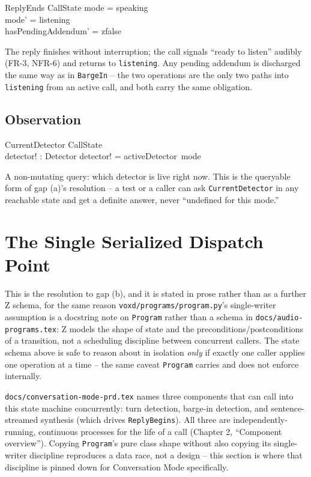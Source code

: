 \documentclass[a4paper,10pt,fleqn]{article}
\begin{document}
\begin{schema}{ReplyEnds}
  \Delta CallState
  \where
  mode = speaking \\
  mode' = listening \\
  hasPendingAddendum' = zfalse
\end{schema}

The reply finishes without interruption; the call signals ``ready to
listen'' audibly (FR-3, NFR-6) and returns to \texttt{listening}. Any
pending addendum is discharged the same way as in \texttt{BargeIn} -- the
two operations are the only two paths into \texttt{listening} from an active
call, and both carry the same obligation.

\subsection{Observation}

\begin{schema}{CurrentDetector}
  \Xi CallState \\
  detector! : Detector
  \where
  detector! = activeDetector~mode
\end{schema}

A non-mutating query: which detector is live right now. This is the
queryable form of gap (a)'s resolution -- a test or a caller can ask
\texttt{CurrentDetector} in any reachable state and get a definite answer,
never ``undefined for this mode.''

\section{The Single Serialized Dispatch Point}
\label{sec:dispatch}

This is the resolution to gap (b), and it is stated in prose rather than as
a further Z schema, for the same reason
\texttt{voxd/programs/program.py}'s single-writer assumption is a docstring
note on \texttt{Program} rather than a schema in
\texttt{docs/audio-programs.tex}: Z models the shape of state and the
preconditions/postconditions of a transition, not a scheduling discipline
between concurrent callers. The state schema above is safe to reason about
in isolation \emph{only} if exactly one caller applies one operation at a
time -- the same caveat \texttt{Program} carries and does not enforce
internally.

\texttt{docs/conversation-mode-prd.tex} names three components that can call
into this state machine concurrently: turn detection, barge-in detection,
and sentence-streamed synthesis (which drives \texttt{ReplyBegins}). All
three are independently-running, continuous processes for the life of a
call (Chapter 2, ``Component overview''). Copying \texttt{Program}'s pure
class shape without also copying its single-writer discipline reproduces a
data race, not a design -- this section is where that discipline is pinned
down for Conversation Mode specifically.
\end{document}
